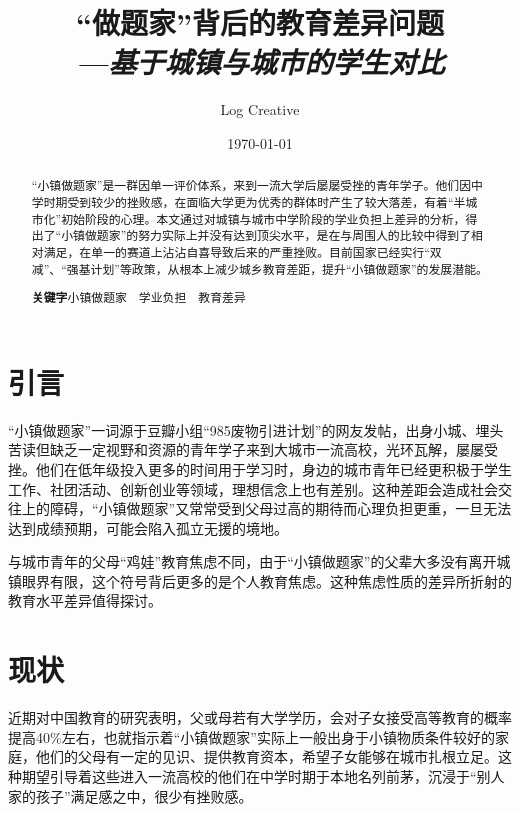 \documentclass[10pt,a4paper,heading=false]{ctexart}
\begin{document}
    \title{\vspace{-4cm}“做题家”背后的教育差异问题
    \\\hspace*{15ex}\emph{\Large---基于城镇与城市的学生对比}
    }
    \author{Log Creative}
    \date{\today}
    \maketitle
    \begin{abstract}
        “小镇做题家”是一群因单一评价体系，来到一流大学后屡屡受挫的青年学子。他们因中学时期受到较少的挫败感，在面临大学更为优秀的群体时产生了较大落差，有着“半城市化”初始阶段的心理。本文通过对城镇与城市中学阶段的学业负担上差异的分析，得出了“小镇做题家”的努力实际上并没有达到顶尖水平，是在与周围人的比较中得到了相对满足，在单一的赛道上沾沾自喜导致后来的严重挫败。目前国家已经实行“双减”、“强基计划”等政策，从根本上减少城乡教育差距，提升“小镇做题家”的发展潜能。

        \textbf{关键字}\quad 小镇做题家~~学业负担~~教育差异
    \end{abstract}
    \section{引言}
    “小镇做题家”一词源于豆瓣小组“985废物引进计划”的网友发帖，出身小城、埋头苦读但缺乏一定视野和资源的青年学子来到大城市一流高校，光环瓦解，屡屡受挫。\cite{solver}他们在低年级投入更多的时间用于学习时，身边的城市青年已经更积极于学生工作、社团活动、创新创业等领域，理想信念上也有差别。这种差距会造成社会交往上的障碍，“小镇做题家”又常常受到父母过高的期待而心理负担更重，一旦无法达到成绩预期，可能会陷入孤立无援的境地。\cite{solveranalysis}

    与城市青年的父母“鸡娃”教育焦虑不同，由于“小镇做题家”的父辈大多没有离开城镇眼界有限，这个符号背后更多的是个人教育焦虑。这种焦虑性质的差异所折射的教育水平差异值得探讨。
    \section{现状}
    近期对中国教育的研究表明，父或母若有大学学历，会对子女接受高等教育的概率提高40\%左右\cite{familyedu}，也就指示着“小镇做题家”实际上一般出身于小镇物质条件较好的家庭，他们的父母有一定的见识、提供教育资本，希望子女能够在城市扎根立足。这种期望引导着这些进入一流高校的他们在中学时期于本地名列前茅，沉浸于“别人家的孩子”满足感之中，很少有挫败感。
\end{document}
